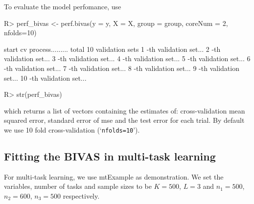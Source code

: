 \documentclass[11pt]{article}
\begin{document}
To evaluate the model perfomance, use
\begin{Schunk}
\begin{Sinput}
R> perf_bivas <- perf.bivas(y = y, X = X, group = group, coreNum = 2, nfolds=10)
\end{Sinput}
\begin{Soutput}
start cv process......... total 10 validation sets 
1 -th validation set... 
2 -th validation set... 
3 -th validation set... 
4 -th validation set... 
5 -th validation set... 
6 -th validation set... 
7 -th validation set... 
8 -th validation set... 
9 -th validation set... 
10 -th validation set... 
\end{Soutput}
\begin{Sinput}
R> str(perf_bivas)
\end{Sinput}
\end{Schunk}
which returns a list of vectors containing the estimates of: cross-validation mean squared error, standard error of mse and the test error for each trial. By default we use 10 fold cross-validation (`\texttt{nfolds=10}').


\subsection{Fitting the BIVAS in multi-task learning}\label{bivas_mt}
For multi-task learning, we use mtExample as demonstration. We set the variables, number of tasks and sample sizes to be $K=500$, $L=3$ and $n_1=500$, $n_2=600$, $n_3=500$ respectively.
\end{document}
